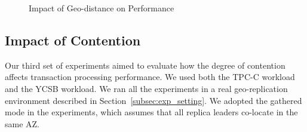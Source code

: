 \documentclass[conference]{IEEEtran}
\begin{document}
\begin{figure}[tbp]
  \centering


\caption{Impact of Geo-distance on Performance}
\label{fig:new_order_add_log_cost}
\end{figure}


\subsection{Impact of Contention}

Our third set of experiments aimed to evaluate how the degree of contention affects transaction processing performance.
We used both the TPC-C workload and the YCSB workload.
We ran all the experiments in a real geo-replication environment described in Section~\ref{subsec:exp_setting}.
We adopted the gathered mode in the experiments, which assumes that all replica leaders co-locate in the same AZ.
\end{document}
